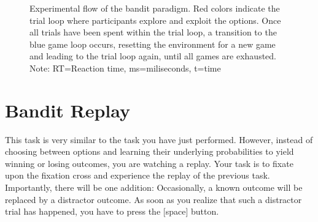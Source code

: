 \documentclass[12pt, oneside]{scrartcl}
\newcommand{\descrTextWidth}{4cm}
\begin{document}
\begin{figure}[h!]
\begin{center}
{
} %
\captionsetup{width=1\linewidth, format=plain}
\caption[Flow Bandit Paradigm]{Experimental flow of the bandit paradigm. Red colors indicate the trial loop where participants explore and exploit the options. Once all trials have been spent within the trial loop, a transition to the blue game loop occurs, resetting the environment for a new game and leading to the trial loop again, until all games are exhausted. Note: RT=Reaction time, ms=miliseconds, t=time}
\label{fig:banditFlow}
\end{center}
\end{figure}




\pagebreak
\section{Bandit Replay}

This task is very similar to the task you have just performed. However, instead of choosing between options and learning their underlying probabilities to yield winning or losing outcomes, you are watching a replay. Your task is to fixate upon the fixation cross and experience the replay of the previous task. Importantly, there will be one addition: Occasionally, a known outcome will be replaced by a distractor outcome. As soon as you realize that such a distractor trial has happened, you have to press the [space] button. \vspace{\baselineskip}
\end{document}

